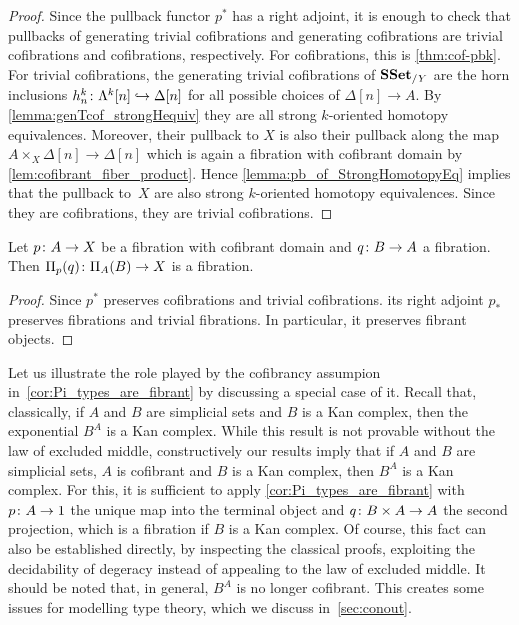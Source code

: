 \documentclass[reqno,10pt,a4paper,oneside,draft]{amsart}
\begin{document}
\begin{proof} Since the pullback functor $p^*$ has a right adjoint,  it is enough to check that pullbacks of generating trivial cofibrations and generating cofibrations are trivial cofibrations and cofibrations, respectively. For cofibrations, this is \cref{thm:cof-pbk}. For trivial cofibrations, the generating trivial cofibrations of $\mathbf{SSet}_{/Y}$ are the horn inclusions $h^k_n \colon \Lambda^{k}[n] \hookrightarrow \Delta[n]$ for all possible choices of $\Delta[n] \rightarrow A$. By \cref{lemma:genTcof_strongHequiv} they are all strong $k$-oriented homotopy equivalences. Moreover, their pullback to $X$ is also their pullback along the map $A \times_X \Delta[n] \rightarrow \Delta[n]$ which is again a fibration with cofibrant domain by \cref{lem:cofibrant_fiber_product}. Hence  \cref{lemma:pb_of_StrongHomotopyEq} implies that the pullback 
to~$X$ are also strong $k$-oriented homotopy equivalences. Since they are cofibrations, they are trivial cofibrations.
\end{proof}

\begin{corollary}\label{cor:Pi_types_are_fibrant}
Let $p \colon A \rightarrow X$ be a fibration with cofibrant domain and $q \colon B \rightarrow A$ a fibration. Then $\Pi_p(q) \colon \Pi_A(B) \rightarrow X$ is a fibration.
\end{corollary}

\begin{proof}
Since $p^*$ preserves cofibrations and trivial cofibrations. its right adjoint $p_*$ preserves fibrations and trivial fibrations. In particular, it preserves fibrant objects.
\end{proof}


Let us illustrate the role played by the cofibrancy assumpion in~\cref{cor:Pi_types_are_fibrant} by discussing
a special case of it. Recall that, classically,  if $A$ and $B$ are simplicial
sets and $B$ is a Kan complex, then the exponential $B^A$ is a Kan complex. While this result is
not provable without the law of excluded middle, constructively our results imply that if $A$ and $B$ are simplicial sets, $A$ is cofibrant and $B$ is a Kan complex, then $B^A$ is a Kan complex. For this, it is sufficient to apply \cref{cor:Pi_types_are_fibrant}
with $p \colon A \to 1$ the unique map into the terminal object and $q \colon B \times A \to A$ the second projection, which is a fibration if $B$ is a Kan complex. Of course, this fact can also be established directly, by inspecting the classical proofs, exploiting the decidability of degeracy instead of appealing to the law of excluded middle.
It should be noted that, in general, $B^A$ is no longer cofibrant. This creates some issues for modelling type
theory, which we discuss in~\cref{sec:conout}.
\end{document}
